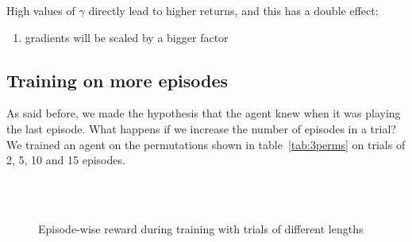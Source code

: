 High values of $\gamma$ directly lead to higher returns, and this has a
double effect:
\begin{enumerate}
	\item gradients will be scaled by a bigger factor
\end{enumerate}


\subsection{Training on more episodes}
\label{section:beyond:moreeps}
As said before, we made the hypothesis that the agent knew when it was playing
the last episode. What happens if we increase the number of episodes in a
trial? We trained an agent on the permutations shown in table~\ref{tab:3perms}
on trials of 2, 5, 10 and 15 episodes.\\
\begin{figure}
	\centering
	\\
	\\
	\caption{Episode-wise reward during training with trials of different
	lengths}
	\label{fig:varied_episode_number}
\end{figure}

